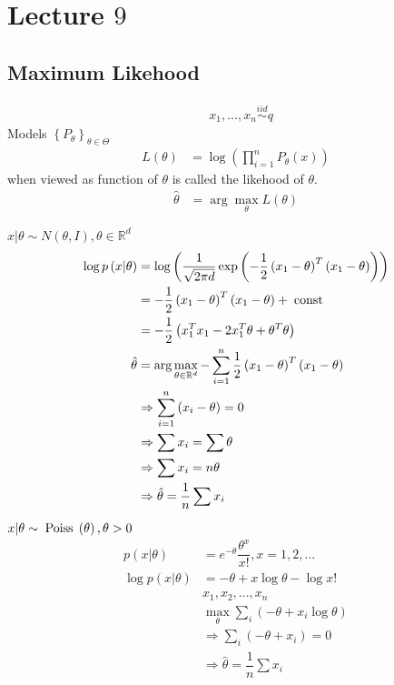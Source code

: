 \documentclass{article}
\begin{document}
\section{Lecture $9$} 


\subsection{Maximum Likehood}
\begin{align*}
&x_{1}, ..., x_{n} \stackrel{iid}{\sim} q 
\end{align*}
Models $\left\{P_{\theta}\right\}_{\theta \in \Theta}$
\begin{align*}
L\left(\theta\right)  &= \log \left(\displaystyle\prod_{i=1}^{n} P_{\theta}\left(x\right)\right)
\end{align*}
when viewed as function of $\theta$ is called the likehood of $\theta$.
\begin{align*}
\hat{\theta} &= \arg\displaystyle\max_{\theta} L\left(\theta\right)
\end{align*}
\begin{eg} \label{eg:normmle} 
$x  | \theta \sim  N\left(\theta, I\right), \theta \in \mathbb{R}^{d}$
\begin{align*}
\log p\left(x | \theta\right) &= \log \left(\dfrac{1}{\sqrt{2 \pi d}} \exp\left(- \dfrac{1}{2} \left(x_{1} - \theta\right)^{T}\left(x_{1} - \theta\right)\right)\right)
\\ &= - \dfrac{1}{2} \left(x_{1} - \theta\right)^{T} \left(x_{1} - \theta\right) + \text{\;const\;}
\\ &= - \dfrac{1}{2} \left(x_{1}^{T} x_{1} - 2 x_{1}^{T} \theta + \theta^{T} \theta\right)
\\ \hat{\theta} &= \arg\displaystyle\max_{\theta \in \mathbb{R}^{d}} - \displaystyle\sum_{i=1}^{n} \dfrac{1}{2} \left(x_{1} - \theta\right)^{T} \left(x_{1} - \theta\right)
\\ &\Rightarrow  \displaystyle\sum_{i=1}^{n} \left(x_{i} - \theta\right) = 0
\\ &\Rightarrow  \displaystyle\sum x_{i} = \displaystyle\sum \theta
\\ &\Rightarrow  \displaystyle\sum x_{i} = n \theta
\\ &\Rightarrow  \hat{\theta} = \dfrac{1}{n} \displaystyle\sum x_{i}
\end{align*}\end{eg}
\begin{eg} \label{eg:poissmle} 
$x  | \theta \sim  \text{\;Poiss\;} \left(\theta\right), \theta > 0$
\begin{align*}
p\left(x | \theta\right)  &= e^{-\theta} \dfrac{\theta^{x}}{x!}, x = 1, 2, ...
\\ \log p\left(x | \theta\right) &= -\theta + x \log \theta - \log x!
\\ &x_{1}, x_{2}, ..., x_{n}
\\ &  \displaystyle\max_{\theta} \displaystyle\sum_{i} \left(-\theta + x_{i} \log \theta\right)
\\ &\Rightarrow  \displaystyle\sum_{i} \left(-\theta + x_{i}\right) = 0
\\ &\Rightarrow  \hat{\theta} = \dfrac{1}{n} \displaystyle\sum x_{i}
\end{align*}\end{eg}
\end{document}

